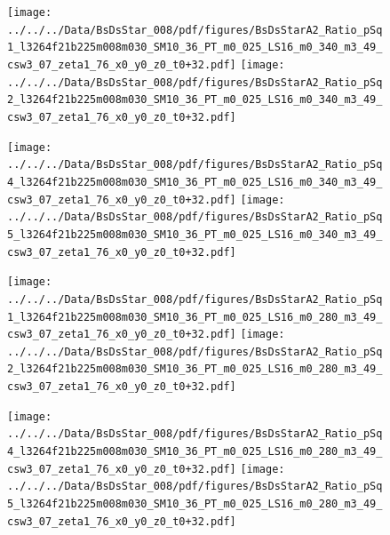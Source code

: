 \documentclass[a4paper,10pt]{article}
\begin{document}
\begin{figure}[p]
 \texttt{[image: ../../../Data/BsDsStar\_008/pdf/figures/BsDsStarA2\_Ratio\_pSq1\_l3264f21b225m008m030\_SM10\_36\_PT\_m0\_025\_LS16\_m0\_340\_m3\_49\_csw3\_07\_zeta1\_76\_x0\_y0\_z0\_t0+32.pdf]} 
 \texttt{[image: ../../../Data/BsDsStar\_008/pdf/figures/BsDsStarA2\_Ratio\_pSq2\_l3264f21b225m008m030\_SM10\_36\_PT\_m0\_025\_LS16\_m0\_340\_m3\_49\_csw3\_07\_zeta1\_76\_x0\_y0\_z0\_t0+32.pdf]} 
 \end{figure}
\begin{figure}[p]
 \texttt{[image: ../../../Data/BsDsStar\_008/pdf/figures/BsDsStarA2\_Ratio\_pSq4\_l3264f21b225m008m030\_SM10\_36\_PT\_m0\_025\_LS16\_m0\_340\_m3\_49\_csw3\_07\_zeta1\_76\_x0\_y0\_z0\_t0+32.pdf]} 
 \texttt{[image: ../../../Data/BsDsStar\_008/pdf/figures/BsDsStarA2\_Ratio\_pSq5\_l3264f21b225m008m030\_SM10\_36\_PT\_m0\_025\_LS16\_m0\_340\_m3\_49\_csw3\_07\_zeta1\_76\_x0\_y0\_z0\_t0+32.pdf]} 
 \end{figure}
\begin{figure}[p]
 \texttt{[image: ../../../Data/BsDsStar\_008/pdf/figures/BsDsStarA2\_Ratio\_pSq1\_l3264f21b225m008m030\_SM10\_36\_PT\_m0\_025\_LS16\_m0\_280\_m3\_49\_csw3\_07\_zeta1\_76\_x0\_y0\_z0\_t0+32.pdf]} 
 \texttt{[image: ../../../Data/BsDsStar\_008/pdf/figures/BsDsStarA2\_Ratio\_pSq2\_l3264f21b225m008m030\_SM10\_36\_PT\_m0\_025\_LS16\_m0\_280\_m3\_49\_csw3\_07\_zeta1\_76\_x0\_y0\_z0\_t0+32.pdf]} 
 \end{figure}
\clearpage
\begin{figure}[p]
 \texttt{[image: ../../../Data/BsDsStar\_008/pdf/figures/BsDsStarA2\_Ratio\_pSq4\_l3264f21b225m008m030\_SM10\_36\_PT\_m0\_025\_LS16\_m0\_280\_m3\_49\_csw3\_07\_zeta1\_76\_x0\_y0\_z0\_t0+32.pdf]} 
 \texttt{[image: ../../../Data/BsDsStar\_008/pdf/figures/BsDsStarA2\_Ratio\_pSq5\_l3264f21b225m008m030\_SM10\_36\_PT\_m0\_025\_LS16\_m0\_280\_m3\_49\_csw3\_07\_zeta1\_76\_x0\_y0\_z0\_t0+32.pdf]} 
 \end{figure}
\clearpage
\end{document}
